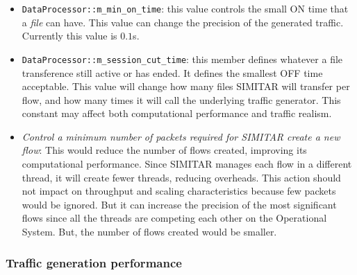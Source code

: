 \begin{itemize}

	\item \texttt{DataProcessor::m\_min\_on\_time}: this value controls the small ON time that a \textit{file} can have. This value  can change the precision of the generated traffic. Currently this value is $0.1$s. 

	\item \texttt{DataProcessor::m\_session\_cut\_time}: this member defines whatever a file transference still active or has ended. It defines the smallest OFF time acceptable. This value will change how many files SIMITAR will transfer per flow, and how many times it will call the underlying traffic generator. This constant may affect both computational performance and traffic realism.

	\item \textit{Control a minimum number of packets required for SIMITAR create a new flow}: This would reduce the number of flows created, improving its computational performance. Since SIMITAR manages each flow in a  different thread, it will create fewer threads, reducing overheads. This action should not impact  on throughput and scaling characteristics because few packets would be ignored. But it can increase the precision of the most significant flows since all the threads are competing each other on the Operational System. But, the number of flows created would be smaller.
	
\end{itemize}




\subsubsection{Traffic generation performance}


